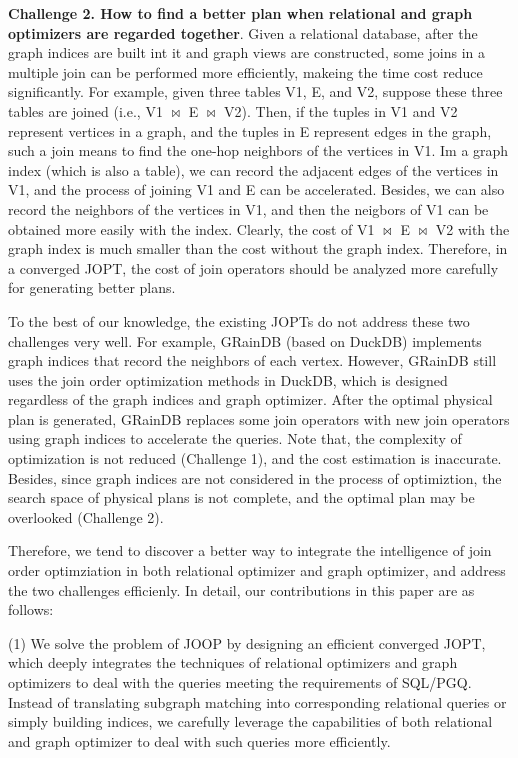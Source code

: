 \documentclass[sigconf, nonacm]{acmart}
\begin{document}
\textbf{Challenge 2. How to find a better plan when relational and graph optimizers are regarded together}.
Given a relational database, after the graph indices are built int it and graph views are constructed, some joins in a multiple join can be performed more efficiently, makeing the time cost reduce significantly.
For example, given three tables V1, E, and V2, suppose these three tables are joined (i.e., V1 $\bowtie$ E $\bowtie$ V2).
Then, if the tuples in V1 and V2 represent vertices in a graph, and the tuples in E represent edges in the graph, such a join means to find the one-hop neighbors of the vertices in V1.
Im a graph index (which is also a table), we can record the adjacent edges of the vertices in V1, and the process of joining V1 and E can be accelerated.
Besides, we can also record the neighbors of the vertices in V1, and then the neigbors of V1 can be obtained more easily with the index.
Clearly, the cost of V1 $\bowtie$ E $\bowtie$ V2 with the graph index is much smaller than the cost without the graph index.
Therefore, in a converged JOPT, the cost of join operators should be analyzed more carefully for generating better plans.


To the best of our knowledge, the existing JOPTs do not address these two challenges very well.
For example, GRainDB (based on DuckDB) implements graph indices that record the neighbors of each vertex.
However, GRainDB still uses the join order optimization methods in DuckDB, which is designed regardless of the graph indices and graph optimizer.
After the optimal physical plan is generated, GRainDB replaces some join operators with new join operators using graph indices to accelerate the queries.
Note that, the complexity of optimization is not reduced (Challenge 1), and the cost estimation is inaccurate.
Besides, since graph indices are not considered in the process of optimiztion, the search space of physical plans is not complete, and the optimal plan may be overlooked (Challenge 2).

Therefore, we tend to discover a better way to integrate the intelligence of join order optimziation in both relational optimizer and graph optimizer, and address the two challenges efficienly.
In detail, our contributions in this paper are as follows:

(1) We solve the problem of JOOP by designing an efficient converged JOPT, which deeply integrates the techniques of relational optimizers and graph optimizers to deal with the queries meeting the requirements of SQL/PGQ.
Instead of translating subgraph matching into corresponding relational queries or simply building indices, we carefully leverage the capabilities of both relational and graph optimizer to deal with such queries more efficiently.
\end{document}

